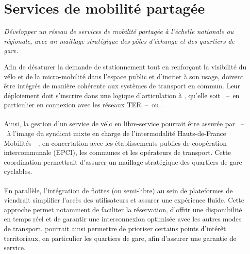 \documentclass[../main.tex]{subfiles}
\begin{document}
    \newpage

    \vspace{15pt}
\section{Services de mobilité partagée}

\begin{block}[Déployer]
    \linespread{0.9}\selectfont %
    \textit{\small{Développer un réseau de services de mobilité partagée à l'échelle nationale ou régionale, avec un maillage stratégique des pôles d'échange et des quartiers de gare.}}
\end{block}

    \begin{multicols}{2}
    \raggedcolumns
    \small{
Afin de désaturer la demande de stationnement tout en renforçant la visibilité du vélo et de la micro-mobilité dans l’espace public et d'inciter à son usage,  doivent être intégrés de manière cohérente aux systèmes de transport en commun. Leur déploiement doit s’inscrire dans une logique d’articulation à , qu’elle soit ~–~en particulier en connexion avec les réseaux TER~–~ou .
    \\\\
Ainsi, la gestion d'un service de vélo en libre-service pourrait être assurée par ~–~à l'image du syndicat mixte en charge de l'intermodalité Hauts-de-France Mobilités~–, en concertation avec les établissements publics de coopération intercommunale (EPCI), les communes et les opérateurs de transport. Cette coordination permettrait d’assurer un maillage stratégique des quartiers de gare cyclables.
    \\\\
En parallèle, l’intégration de flottes  (ou semi-libre) au sein de plateformes de  viendrait simplifier l’accès des utilisateurs et assurer une expérience fluide. Cette approche permet notamment de faciliter la réservation, d’offrir une disponibilité en temps réel et de garantir une interconnexion optimisée avec les autres modes de transport.  pourrait ainsi permettre de prioriser certains points d’intérêt territoriaux, en particulier les quartiers de gare, afin d’assurer une garantie de service.
    }
    \end{multicols}
\end{document}
